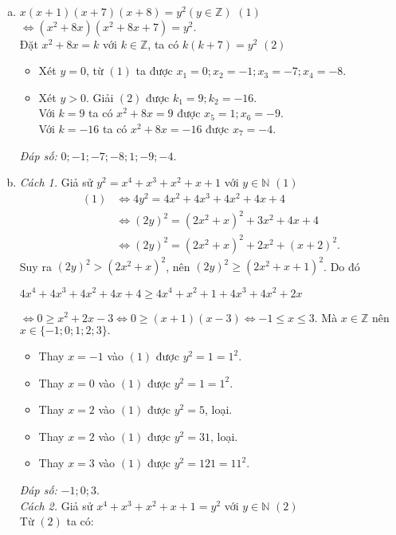 \begin{bt}
{\begin{enumerate}[a)]
\begin{itemize}
  Khi đó $x(x+2)=-4 \Leftrightarrow x^2+2x-4=0$, vô nghiệm.\\
  \emph{Đáp số:} $0$ và $-2$.
\end{itemize}
\item $x(x+1)(x+7)(x+8)=y^2 (y\in \mathbb{Z})$ \hfill$(1)$\\
$\Leftrightarrow (x^2+8x)(x^2+8x+7)=y^2.$\\
Đặt $x^2+8x=k$ với $k\in\mathbb{Z}$, ta có $k(k+7)=y^2$ \hfill$(2)$
\begin{itemize}
  \item Xét $y=0$, từ $(1)$ ta được $x_1=0;x_2=-1;x_3=-7;x_4=-8$.
  \item Xét $y>0$. Giải $(2)$ được $k_1=9;k_2=-16$.\\
  Với $k=9$ ta có $x^2+8x=9$ được $x_5=1;x_6=-9$.\\
  Với $k=-16$ ta có $x^2+8x=-16$ được $x_7=-4.$
\end{itemize}
\emph{Đáp số:} $0;-1;-7;-8;1;-9;-4.$
\item \emph{Cách 1.} Giả sử $y^2=x^4+x^3+x^2+x+1$ với $y\in \mathbb{N}$ \hfill$(1)$
\begin{align*}
(1)&\Leftrightarrow 4y^2=4x^2+4x^3+4x^2+4x+4\\
   &\Leftrightarrow (2y)^2=(2x^2+x)^2+3x^2+4x+4\\
   &\Leftrightarrow (2y)^2=(2x^2+x)^2+2x^2+(x+2)^2.
\end{align*}
Suy ra $(2y)^2>(2x^2+x)^2$, nên $(2y)^2 \geq (2x^2+x+1)^2$. Do đó
\begin{center}
$4x^4+4x^3+4x^2+4x+4 \geq 4x^4+x^2+1+4x^3+4x^2+2x$
\end{center}
$\Leftrightarrow 0\geq x^2+2x-3 \Leftrightarrow 0 \geq (x+1)(x-3) \Leftrightarrow -1 \leq x \leq 3$. Mà $x\in \mathbb{Z}$ nên $x\in \{-1;0;1;2;3\}.$
\begin{itemize}
  \item Thay $x=-1$ vào $(1)$ được $y^2=1=1^2.$
  \item Thay $x=0$ vào $(1)$ được $y^2=1=1^2.$
  \item Thay $x=2$ vào $(1)$ được $y^2=5$, loại.
  \item Thay $x=2$ vào $(1)$ được $y^2=31$, loại.
  \item Thay $x=3$ vào $(1)$ được $y^2=121=11^2.$
\end{itemize}
\emph{Đáp số:} $-1;0;3$.\\
\emph{Cách 2.}
Giả sử $x^4+x^3+x^2+x+1=y^2$ với $y\in \mathbb{N}$ \hfill$(2)$\\
Từ $(2)$ ta có:
\begin{align*}

\end{align*}
\end{enumerate}}
\end{bt}
